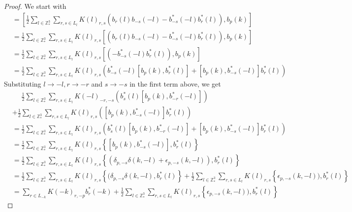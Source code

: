 \documentclass[sn-mathphys,Numbered]{sn-jnl}%
\theoremstyle{plain}
\theoremstyle{definition}
\theoremstyle{remark}
\theoremstyle{plain}
\theoremstyle{definition}
\theoremstyle{remark}
\begin{document}
\begin{proof}
    We start with
    \begin{align}
        [\mathcal{K}, b_p(k)] &=\left[\frac{1}{2}\sum\limits_{l\in \mathbb{Z}^3_*}\sum\limits_{r,s\in L_l}K(l)_{r,s}\left(b_r(l)b_{-s}(-l)-b^*_{-s}(-l)b^*_{r}(l)\right),b_p(k)\right]\nonumber\\
        &=\frac{1}{2}\sum\limits_{l\in \mathbb{Z}^3_*}\sum\limits_{r,s\in L_l}K(l)_{r,s}\left[\left(b_r(l)b_{-s}(-l)-b^*_{-s}(-l)b^*_{r}(l)\right),b_p(k)\right]\nonumber\\
        &=\frac{1}{2}\sum\limits_{l\in \mathbb{Z}^3_*}\sum\limits_{r,s\in L_l}K(l)_{r,s}\left[\left(-b^*_{-s}(-l)b^*_{r}(l)\right),b_p(k)\right]\nonumber\\
        &=\frac{1}{2}\sum\limits_{l\in \mathbb{Z}^3_*}\sum\limits_{r,s\in L_l}K(l)_{r,s}\left(b^*_{-s}(-l)\left[b_p(k),b^*_{r}(l)\right] + \left[b_p(k),b^*_{-s}(-l)\right]b^*_{r}(l) \right)
    \end{align}
    Substituting $l\rightarrow -l, r\rightarrow -r $ and $ s\rightarrow -s$ in the first term above, we get
    \begin{align}
        &\phantom{=}\frac{1}{2}\sum\limits_{l\in \mathbb{Z}^3_*}\sum\limits_{r,s\in L_l}K(-l)_{-r,-s}\left(b^*_{s}(l)\left[b_p(k),b^*_{-r}(-l)\right]\right) \nonumber\\
        &+\frac{1}{2}\sum\limits_{l\in \mathbb{Z}^3_*}\sum\limits_{r,s\in L_l}K(l)_{r,s}\left( \left[b_p(k),b^*_{-s}(-l)\right]b^*_{r}(l) \right)\nonumber\\
        &=\frac{1}{2}\sum\limits_{l\in \mathbb{Z}^3_*}\sum\limits_{r,s\in L_l}K(l)_{r,s}\left(b^*_{s}(l)\left[b_p(k),b^*_{-r}(-l)\right] + \left[b_p(k),b^*_{-s}(-l)\right]b^*_{r}(l) \right)\nonumber\\
        &= \frac{1}{2}\sum\limits_{l\in \mathbb{Z}^3_*}\sum\limits_{r,s\in L_l}K(l)_{r,s}\left\{\left[b_p(k),b^*_{-s}(-l)\right],b^*_{r}(l) \right\}\nonumber\\
        &= \frac{1}{2}\sum\limits_{l\in \mathbb{Z}^3_*}\sum\limits_{r,s\in L_l}K(l)_{r,s}\left\{(\delta_{p,-s}\delta(k,-l) + \epsilon_{p,-s}(k,-l)),b^*_{r}(l) \right\}\nonumber\\
        &= \frac{1}{2}\sum\limits_{l\in \mathbb{Z}^3_*}\sum\limits_{r,s\in L_l}K(l)_{r,s}\left\{(\delta_{p,-s}\delta(k,-l),b^*_{r}(l) \right\} + \frac{1}{2}\sum\limits_{l\in \mathbb{Z}^3_*}\sum\limits_{r,s\in L_l}K(l)_{r,s}\left\{\epsilon_{p,-s}(k,-l)),b^*_{r}(l) \right\}\nonumber\\
        &=\sum\limits_{r\in L_{-k}}K(-k)_{r,-p}b^*_r(-k) + \frac{1}{2}\sum\limits_{l\in \mathbb{Z}^3_*}\sum\limits_{r,s\in L_l}K(l)_{r,s}\left\{\epsilon_{p,-s}(k,-l)),b^*_{r}(l) \right\}\nonumber

\end{align}
\end{proof}
\end{document}
